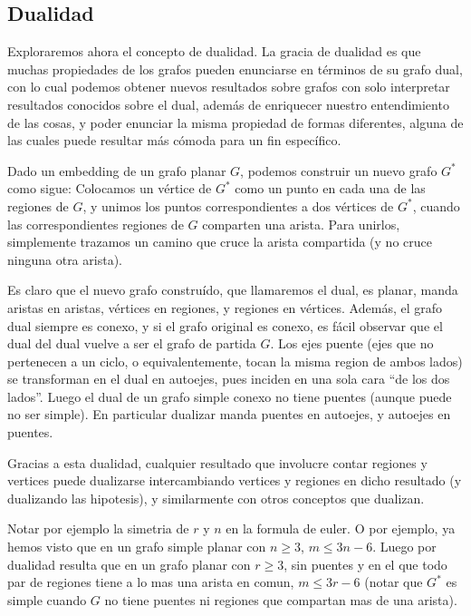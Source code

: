 \documentclass{article}
\begin{document}
\subsection{Dualidad}

Exploraremos ahora el concepto de dualidad. La gracia de dualidad es que muchas propiedades de los grafos pueden enunciarse en términos
de su grafo dual, con lo cual podemos obtener nuevos resultados sobre grafos con solo interpretar resultados conocidos sobre el dual,
además de enriquecer nuestro entendimiento de las cosas, y poder enunciar la misma propiedad de formas diferentes, alguna de las cuales
puede resultar más cómoda para un fin específico.

Dado un embedding de un grafo planar $G$, podemos construir un nuevo grafo $G^*$ como sigue: Colocamos un vértice de $G^*$ como un punto en 
cada una de las regiones de $G$, y unimos los puntos correspondientes a dos vértices de $G^*$, cuando las correspondientes regiones de
$G$ comparten una arista. Para unirlos, simplemente trazamos un camino que cruce la arista compartida (y no cruce ninguna otra arista).

Es claro que el nuevo grafo construído, que llamaremos el dual, es planar, manda aristas en aristas, vértices en regiones, y regiones en vértices. Además,
el grafo dual siempre es conexo, y si el grafo original es conexo, es fácil observar que el dual del dual vuelve a ser el grafo de partida $G$. 
Los ejes puente (ejes que no pertenecen a un ciclo, o equivalentemente, tocan la misma region de ambos lados)
se transforman en el dual en autoejes, pues inciden en una sola cara ``de los dos lados''. Luego el dual de un grafo simple conexo no tiene
puentes (aunque puede no ser simple). En particular dualizar manda puentes en autoejes, y autoejes en puentes.

Gracias a esta dualidad, cualquier resultado que involucre contar regiones y vertices puede dualizarse intercambiando vertices y regiones
en dicho resultado (y dualizando las hipotesis), y similarmente con otros conceptos que dualizan. 

Notar por ejemplo la simetria de $r$ y $n$ en la formula de euler. 
O por ejemplo, ya hemos visto que en un grafo simple planar con $n \geq 3$, $m \leq 3n-6$. Luego por dualidad resulta que
en un grafo planar con $r \geq 3$, sin puentes y en el que todo par de regiones tiene a lo mas una arista en comun, 
$m \leq 3r - 6$ (notar que $G^*$ es simple cuando $G$ no tiene puentes ni regiones que compartan mas de una arista).
\end{document}
